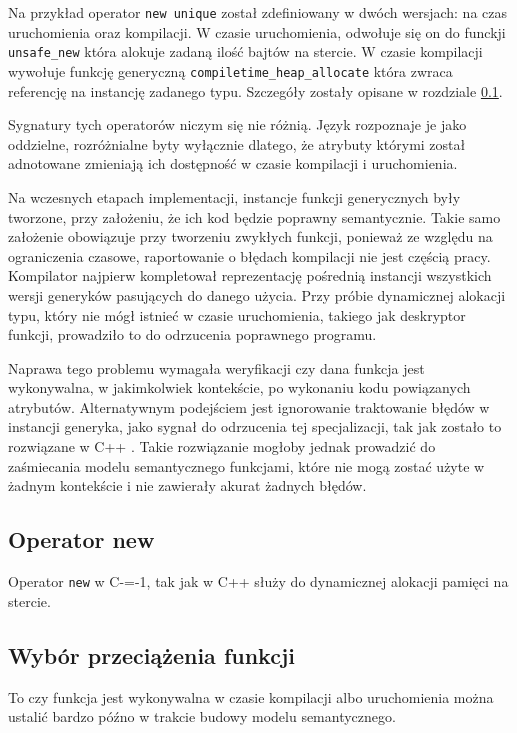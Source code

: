 Na przykład operator \lstinline{new unique} został zdefiniowany w dwóch wersjach: na czas uruchomienia oraz kompilacji.
W czasie uruchomienia, odwołuje się on do funckji \lstinline{unsafe_new} która alokuje zadaną ilość bajtów na stercie.
W czasie kompilacji wywołuje funkcję generyczną \lstinline{compiletime_heap_allocate} która zwraca referencję na instancję zadanego typu.
Szczegóły zostały opisane w rozdziale \ref{operator_new}.

Sygnatury tych operatorów niczym się nie różnią.
Język rozpoznaje je jako oddzielne, rozróżnialne byty wyłącznie dlatego, że atrybuty którymi został adnotowane zmieniają ich dostępność w czasie kompilacji i uruchomienia.

Na wczesnych etapach implementacji, instancje funkcji generycznych były tworzone, przy założeniu, że ich kod będzie poprawny semantycznie.
Takie samo założenie obowiązuje przy tworzeniu zwykłych funkcji, ponieważ ze względu na ograniczenia czasowe, raportowanie o błędach kompilacji nie jest częścią pracy.
Kompilator najpierw kompletował reprezentację pośrednią instancji wszystkich wersji generyków pasujących do danego użycia.
Przy próbie dynamicznej alokacji typu, który nie mógł istnieć w czasie uruchomienia, takiego jak deskryptor funkcji, prowadziło to do odrzucenia poprawnego programu.

Naprawa tego problemu wymagała weryfikacji czy dana funkcja jest wykonywalna, w jakimkolwiek kontekście, po wykonaniu kodu powiązanych atrybutów.
Alternatywnym podejściem jest ignorowanie traktowanie błędów w instancji generyka, jako sygnał do odrzucenia tej specjalizacji, tak jak zostało to rozwiązane w C++ \cite{cppTemplatesCompleteGuide}.
Takie rozwiązanie mogłoby jednak prowadzić do zaśmiecania modelu semantycznego funkcjami, które nie mogą zostać użyte w żadnym kontekście i nie zawierały akurat żadnych błędów.
\subsection{Operator new}
\label{operator_new}
Operator \lstinline{new} w C-=-1, tak jak w C++ służy do dynamicznej alokacji pamięci na stercie.

\subsection{Wybór przeciążenia funkcji}
\label{Function_overload_resolution}
To czy funkcja jest wykonywalna w czasie kompilacji albo uruchomienia można ustalić bardzo późno w trakcie budowy modelu semantycznego.

